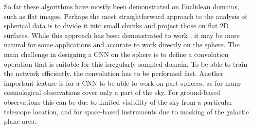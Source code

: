 \documentclass[final,twocolumn,3p,times,authoryear]{elsarticle}
\newcommand{\nati}[1]{{\color[rgb]{.1,.6,.1}{#1}}}
\newcommand{\todo}[1]{{\color[rgb]{.6,.1,.6}{#1}}}
\newcommand{\1}{\b{1}}              %
\newcommand{\0}{\b{0}}              %
\begin{document}

So far these algorithms have mostly been demonstrated on Euclidean domains, such as flat images.
Perhaps the most straightforward approach to the analysis of spherical data is to divide it into small chunks and project those on flat 2D surfaces. \todo{Tune according to the story in the related work.}
While this approach has been demonstrated to work \citep{fluri2018deep,gupta2018nongaussianinformation,schmelze2017cosmologicalmodel,gillet2018deeplearning}, it may be more natural for some applications and accurate to work directly on the sphere.
The main challenge in designing a CNN on the sphere is to define a convolution operation that is suitable for this irregularly sampled domain.
To be able to train the network efficiently, the convolution has to be performed fast.
Another important feature is for a CNN to be able to work on part-spheres, as for many cosmological observations cover only a part of the sky.
For ground-based observations this can be due to limited visibility of the sky from a particular telescope location, and for space-based instruments due to masking of the galactic plane area.
\end{document}
